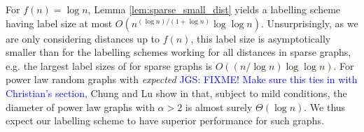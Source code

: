 For $f(n) = \log n$, Lemma \ref{lem:sparse_small_dist} yields a labelling scheme having label size
at most $O\left(n^{(\log n)/(1+ \log n)} \log\log n \right)$. Unsurprisingly, as we are only considering distances up
to $f(n)$, this label size is asymptotically smaller than for the labelling
schemes working for all distances in sparse graphs, e.g. the largest label sizes of \cite{DBLP:journals/corr/GawrychowskiKU15} for sparse graphs is $O((n/\log n) \log\log n)$.
For power law random graphs with \emph{expected} \textcolor{blue}{JGS: FIXME! Make sure this ties in with Christian's section}, Chung and Lu show in \cite{chung2004average} that, subject to mild conditions, the diameter of power law graphs with $\alpha > 2$ is almost surely $\Theta(\log n)$. We thus expect our labelling scheme to have
superior performance for such graphs.
